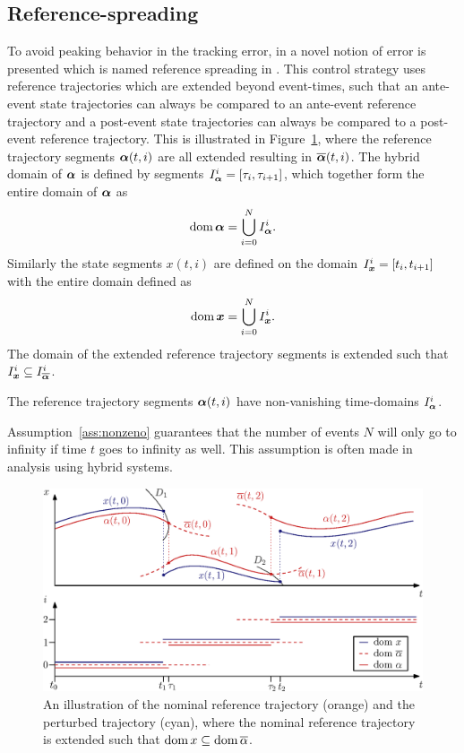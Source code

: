 \documentclass[../DC2017114Bouma.tex]{subfiles}
\begin{document}
\subsection{Reference-spreading}
To avoid peaking behavior in the tracking error, in \cite{Saccon2014} a novel notion of error is presented which is named reference spreading in \cite{Rijnen2016}. This control strategy uses reference trajectories which are extended beyond event-times, such that an ante-event state trajectories can always be compared to an ante-event reference trajectory and a post-event state trajectories can always be compared to a post-event reference trajectory. This is illustrated in Figure~\ref{fig:3refspread}, where the reference trajectory segments $\boldsymbol{\alpha}(t,i)$ are all extended resulting in $\overline{\boldsymbol{\alpha}}(t,i)$. The hybrid domain \cite{Goebel2009} of $\boldsymbol{\alpha}$ is defined by segments $I^i_{\boldsymbol{\alpha}} = [\tau_i,\tau_{i+1}]$, which together form the entire domain of $\boldsymbol{\alpha}$ as
\begin{align}
\operatorname{\textnormal{dom}}\boldsymbol{\alpha} = \bigcup^N_{i=0}I_{\boldsymbol{\alpha}}^i.
\end{align}
%
Similarly the state segments $x(t,i)$ are defined on the domain $I^i_{\boldsymbol{x}} = [t_i,t_{i+1}]$ with the entire domain defined as
\begin{align}
\operatorname{\textnormal{dom}}{\boldsymbol{x}} = \bigcup^N_{i=0}I_{{\boldsymbol{x}}}^i.
\end{align}
The domain of the extended reference trajectory segments is extended such that $I_{{\boldsymbol{x}}}^i\subseteq I_{\overline{\boldsymbol{\alpha}}}^i$.

\begin{myass}
The reference trajectory segments $\boldsymbol{\alpha}(t,i)$ have non-vanishing time-domains $I_{\boldsymbol{\alpha}}^i$.\label{ass:nonzeno}
\end{myass}

Assumption~\ref{ass:nonzeno} guarantees that the number of events $N$ will only go to infinity if time $t$ goes to infinity as well. This assumption is often made in analysis using hybrid systems.

\begin{figure}[h]
\centering
\includegraphics[width=.9\textwidth]{refspreaddom.eps}\caption{An illustration of the nominal reference trajectory (orange) and the perturbed trajectory (cyan), where the nominal reference trajectory is extended such that $\operatorname{\textnormal{dom}} x\subseteq\operatorname{\textnormal{dom}} \overline{\alpha}$.} \label{fig:3refspread}
\end{figure}
\end{document}

